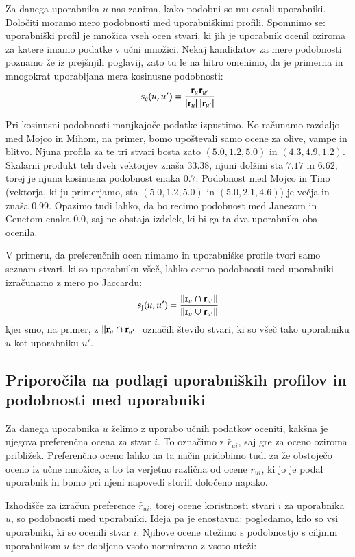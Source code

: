 Za danega uporabnika $u$ nas zanima, kako podobni so mu ostali uporabniki. Določiti moramo mero podobnosti med uporabniškimi profili. Spomnimo se: uporabniški profil je množica vseh ocen stvari, ki jih je uporabnik ocenil oziroma za katere imamo podatke v učni množici. Nekaj kandidatov za mere podobnosti poznamo že iz prejšnjih poglavij, zato tu le na hitro omenimo, da je primerna in mnogokrat uporabljana mera kosinusne podobnosti:
%
$$ s_{\rm c}(u,u')={{\bf r}_u {\bf r}_{u'} \over |{\bf r}_u|\ |{\bf r}_{u'}|}$$
%

Pri kosinusni podobnosti manjkajoče podatke izpustimo. Ko računamo razdaljo med Mojco in Mihom, na primer, bomo upoštevali samo ocene za olive, vampe in blitvo. Njuna profila za te tri stvari bosta zato $(5.0, 1.2, 5.0)$ in $(4.3, 4.9, 1.2)$. Skalarni produkt teh dveh vektorjev znaša $33.38$, njuni dolžini sta $7.17$ in $6.62$, torej je njuna kosinusna podobnost enaka $0.7$. Podobnost med Mojco in Tino (vektorja, ki ju primerjamo, sta $(5.0, 1.2, 5.0)$ in $(5.0, 2.1, 4.6)$) je večja in znaša $0.99$. Opazimo tudi lahko, da bo recimo podobnost med Janezom in Cenetom enaka $0.0$, saj ne obstaja izdelek, ki bi ga ta dva uporabnika oba ocenila.

V primeru, da preferenčnih ocen nimamo in uporabniške profile tvori samo seznam stvari, ki so uporabniku všeč, lahko oceno podobnosti med uporabniki izračunamo z mero po Jaccardu:
%
$$ s_{\rm J}(u, u')={||{\bf r}_u\cap{\bf r}_{u'}|| \over ||{\bf r}_u\cup{\bf r}_{u'}||}$$
kjer smo, na primer, z $||{\bf r}_u\cap{\bf r}_{u'}||$ označili število stvari, ki so všeč tako uporabniku $u$ kot uporabniku $u'$.

\subsection{Priporočila na podlagi uporabniških profilov in podobnosti med uporabniki}

Za danega uporabnika $u$ želimo z uporabo učnih podatkov oceniti, kakšna je njegova preferenčna ocena za stvar $i$. To označimo z $\hat{r}_{ui}$, saj gre za oceno oziroma približek. Preferenčno oceno lahko na ta način pridobimo tudi za že obstoječo oceno iz učne množice, a bo ta verjetno različna od ocene $r_{ui}$, ki jo je podal uporabnik in bomo pri njeni napovedi storili določeno napako.

Izhodišče za izračun preference $\hat{r}_{ui}$, torej ocene koristnosti stvari $i$ za uporabnika $u$, so podobnosti med uporabniki. Ideja pa je enostavna: pogledamo, kdo so vsi uporabniki, ki so ocenili stvar $i$. Njihove ocene utežimo s podobnostjo s ciljnim uporabnikom $u$ ter dobljeno vsoto normiramo z vsoto uteži:

